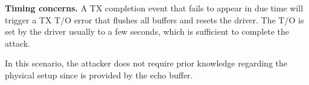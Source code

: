 \noindent\textbf{Timing concerns.} A TX completion event that fails to appear in due time will trigger a TX T/O error that flushes all buffers and resets the driver. The T/O is set by the driver usually to a few seconds, which is sufficient to complete the attack.
 
In this scenario, the attacker does not require prior knowledge regarding the physical setup since \motivation{} is provided by the echo buffer.  







